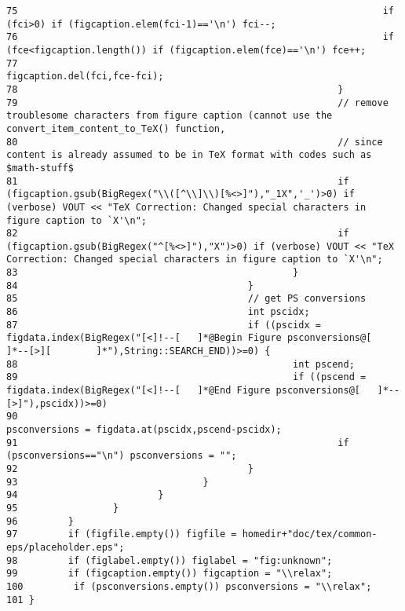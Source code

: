 \begin{verbatim}
75                                                                 if (fci>0) if (figcaption.elem(fci-1)=='\n') fci--;
76                                                                 if (fce<figcaption.length()) if (figcaption.elem(fce)=='\n') fce++;
77                                                                 figcaption.del(fci,fce-fci);
78                                                         }
79                                                         // remove troublesome characters from figure caption (cannot use the convert_item_content_to_TeX() function,
80                                                         // since content is already assumed to be in TeX format with codes such as $math-stuff$
81                                                         if (figcaption.gsub(BigRegex("\\([^\\]\\)[%<>]"),"_1X",'_')>0) if (verbose) VOUT << "TeX Correction: Changed special characters in figure caption to `X'\n";
82                                                         if (figcaption.gsub(BigRegex("^[%<>]"),"X")>0) if (verbose) VOUT << "TeX Correction: Changed special characters in figure caption to `X'\n";
83                                                 }
84                                         }
85                                         // get PS conversions
86                                         int pscidx;
87                                         if ((pscidx = figdata.index(BigRegex("[<]!--[   ]*@Begin Figure psconversions@[         ]*--[>][        ]*"),String::SEARCH_END))>=0) {
88                                                 int pscend;
89                                                 if ((pscend = figdata.index(BigRegex("[<]!--[   ]*@End Figure psconversions@[   ]*--[>]"),pscidx))>=0)
90                                                         psconversions = figdata.at(pscidx,pscend-pscidx);
91                                                         if (psconversions=="\n") psconversions = "";
92                                         }
93                                 }
94                         }
95                 }
96         }
97         if (figfile.empty()) figfile = homedir+"doc/tex/common-eps/placeholder.eps";
98         if (figlabel.empty()) figlabel = "fig:unknown";
99         if (figcaption.empty()) figcaption = "\\relax";
100         if (psconversions.empty()) psconversions = "\\relax";
101 }
\end{verbatim}\normalsize 
{}
